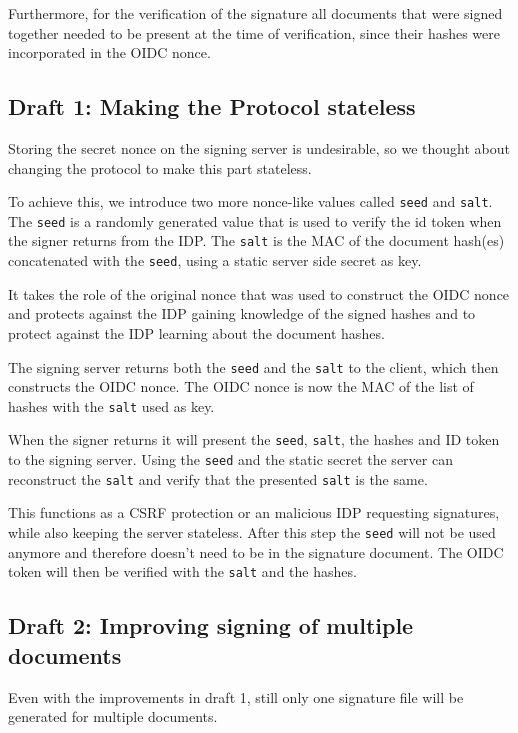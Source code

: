 Furthermore,
for the verification of the signature all documents that were signed together needed to be present at the time of verification,
since their hashes were incorporated in the \gls{OIDC} nonce.

\subsection{Draft 1: Making the Protocol stateless}\label{subsec:draft-1:-making-the-protocol-stateless}
Storing the secret nonce on the signing server is undesirable,
so we thought about changing the protocol to make this part stateless.

To achieve this, we introduce two more nonce-like values called \texttt{seed} and \texttt{salt}.
The \texttt{seed} is a randomly generated value that is used to verify the id token when the signer returns from the \gls{IDP}.
The \texttt{salt} is the \gls{MAC} of the document hash(es) concatenated with the \texttt{seed}, using a static server side secret as key.

It takes the role of the original nonce that was used to construct the \gls{OIDC} nonce and protects against the \gls{IDP} gaining knowledge of the signed hashes and to protect against the \gls{IDP} learning about the document hashes.

The signing server returns both the \texttt{seed} and the \texttt{salt} to the client,
which then constructs the \gls{OIDC} nonce.
The \gls{OIDC} nonce is now the \gls{MAC} of the list of hashes with the \texttt{salt} used as key.

When the signer returns it will present the \texttt{seed}, \texttt{salt}, the hashes and ID token to the signing server.
Using the \texttt{seed} and the static secret the server can reconstruct the \texttt{salt} and verify that the presented \texttt{salt} is the same.

This functions as a \gls{CSRF} protection or an malicious \gls{IDP} requesting signatures, while also keeping the server stateless.
After this step the \texttt{seed} will not be used anymore and therefore doesn't need to be in the signature document.
The \gls{OIDC} token will then be verified with the \texttt{salt} and the hashes.

\subsection{Draft 2: Improving signing of multiple documents}\label{subsec:draft-2:-improving-signing-of-multiple-documents}
Even with the improvements in draft 1, still only one signature file will be generated for multiple documents.

